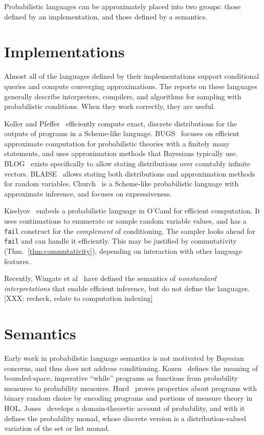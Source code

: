 Probabilistic languages can be approximately placed into two groups: those defined by an implementation, and those defined by a semantics.

\section{Implementations}

Almost all of the languages defined by their implementations support conditional queries and compute converging approximations.
The reports on these languages generally describe interpreters, compilers, and algorithms for sampling with probabilistic conditions.
When they work correctly, they are useful.

Koller and Pfeffer~\cite{cit:koller-1997aaai-bayes-programs-short} efficiently compute exact, discrete distributions for the outputs of programs in a Scheme-like language.
BUGS~\cite{cit:winbugs-language-short} focuses on efficient approximate computation for probabilistic theories with a finitely many statements, and uses approximation methods that Bayesians typically use.
BLOG~\cite{cit:blog-language-short} exists specifically to allow stating distributions over countably infinite vectors.
BLAISE~\cite{cit:blaise-language} allows stating both distributions and approximation methods for random variables.
Church~\cite{cit:church-language-short} is a Scheme-like probabilistic language with approximate inference, and focuses on expressiveness.

Kiselyov~\cite{cit:kiselyov-2008uai-monolingual} embeds a probabilistic language in O'Caml for efficient computation.
It uses continuations to enumerate or sample random variable values, and has a \texttt{fail} construct for the \textit{complement} of conditioning.
The sampler looks ahead for \texttt{fail} and can handle it efficiently.
This may be justified by commutativity (Thm.~\ref{thm:commutativity}), depending on interaction with other language features.

Recently, Wingate et al~\cite{cit:wingate-2011ais-lightweight,cit:wingate-2011nips-nonstandard} have defined the semantics of \emph{nonstandard interpretations} that enable efficient inference, but do not define the languages.
[XXX: recheck, relate to computation indexing]

\section{Semantics}

Early work in probabilistic language semantics is not motivated by Bayesian concerns, and thus does not address conditioning.
Kozen~\cite{cit:kozen-1979fcs-prob-programs-short} defines the meaning of bounded-space, imperative ``while'' programs as functions from probability measures to probability measures.
Hurd~\cite{cit:hurd-2002thesis} proves properties about programs with binary random choice by encoding programs and portions of measure theory in HOL.
Jones~\cite{cit:jones-1990thesis} develops a domain-theoretic account of probability, and with it defines the probability monad, whose discrete version is a distribution-valued variation of the set or list monad.

